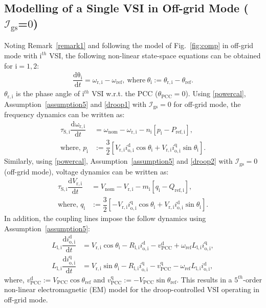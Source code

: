 \documentclass[journal]{IEEEtran}
\begin{document}
\subsection{Modelling of a Single VSI in Off-grid Mode ($\mathcal{I}_\mathrm{gs}$=$0$)}
Noting Remark~\ref{remark1} and following the model of Fig.~\ref{fig:comp} in off-grid mode with $\mathrm{i}^{th}$ VSI, the following non-linear state-space equations can be obtained for $\mathrm{i}=1,2$:
\begin{align}\label{thetaID0}
    \dfrac{\mathrm{d\theta_\mathrm{i}}}{\mathrm{d}t} = \omega_\mathrm{r,i}-\omega_\mathrm{ref},~\text{where}~\theta_\mathrm{i}:=\theta_\mathrm{r,i}-\theta_\mathrm{ref}.
\end{align}
$\theta_\mathrm{r,i}$ is the phase angle of $\mathrm{i}^{th}$ VSI w.r.t. the PCC ($\theta_\mathrm{PCC}=0$). Using \eqref{powercal}, Assumption~\ref{assumption5} and \eqref{droop1} with $\mathcal{I}_\mathrm{gs}=0$ for off-grid mode, the frequency dynamics can be written as:
\begin{align}
    \tau_\mathrm{S,i}\dfrac{\mathrm{d\omega_\mathrm{r,i}}}{\mathrm{d}t}&=\omega_\mathrm{nom}-\omega_\mathrm{r,i}-n_\mathrm{i}[p_\mathrm{i} -P_\mathrm{ref,i}],\label{freqID0a}\\
    \text{where,~}p_\mathrm{i}&:=\dfrac{3}{2}[V_\mathrm{r,i}i_\mathrm{o,i}^\mathrm{d}\cos\theta_\mathrm{i}+V_\mathrm{r,i}i_\mathrm{o,i}^\mathrm{q}\sin\theta_\mathrm{i}].\label{freqID0b}
\end{align}
Similarly, using \eqref{powercal}, Assumption~\ref{assumption5} and \eqref{droop2} with $\mathcal{I}_\mathrm{gs}=0$ (off-grid mode), voltage dynamics can be written as:
\begin{align}
    \tau_\mathrm{S,i}\dfrac{\mathrm{d}V_\mathrm{r,i}}{\mathrm{d}t}&=V_\mathrm{nom}-V_\mathrm{r,i}-m_\mathrm{i}[q_\mathrm{i} -Q_\mathrm{ref,i}],\label{voltID0a}\\
    \text{where,~}q_\mathrm{i}&:=\dfrac{3}{2}[-V_\mathrm{r,i}i_\mathrm{o,i}^\mathrm{q}\cos\theta_\mathrm{i}+V_\mathrm{r,i}i_\mathrm{o,i}^\mathrm{d}\sin\theta_\mathrm{i}].\label{voltID0b}
\end{align}
In addition, the coupling lines impose the follow dynamics using Assumption~\ref{assumption5}:
\begin{align}
    L_\mathrm{l,i}\dfrac{\mathrm{d}i_\mathrm{o,i}^\mathrm{d}}{\mathrm{d}t}&=V_\mathrm{r,i}\cos\theta_\mathrm{i}-R_\mathrm{l,i}i_\mathrm{o,i}^\mathrm{d}-v_\mathrm{PCC}^\mathrm{d}+\omega_{\mathrm{ref}}L_\mathrm{l,i}i_\mathrm{o,i}^\mathrm{q},\label{ida}\\
    L_\mathrm{l,i}\dfrac{\mathrm{d}i_\mathrm{o,i}^\mathrm{q}}{\mathrm{d}t}&=V_\mathrm{r,i}\sin\theta_\mathrm{i}-R_\mathrm{l,i}i_\mathrm{o,i}^\mathrm{q}-v_\mathrm{PCC}^\mathrm{q}-\omega_{\mathrm{ref}}L_\mathrm{l,i}i_\mathrm{o,i}^\mathrm{d},\label{idb}
\end{align}
where, $v_\mathrm{PCC}^\mathrm{d}:=V_\mathrm{PCC}\cos \theta_\mathrm{ref}$ and $v_\mathrm{PCC}^\mathrm{q}:=-V_\mathrm{PCC}\sin \theta_\mathrm{ref}$. This results in a $5^{th}$-order non-linear electromagnetic (EM) model for the droop-controlled VSI operating in off-grid mode.
\end{document}
